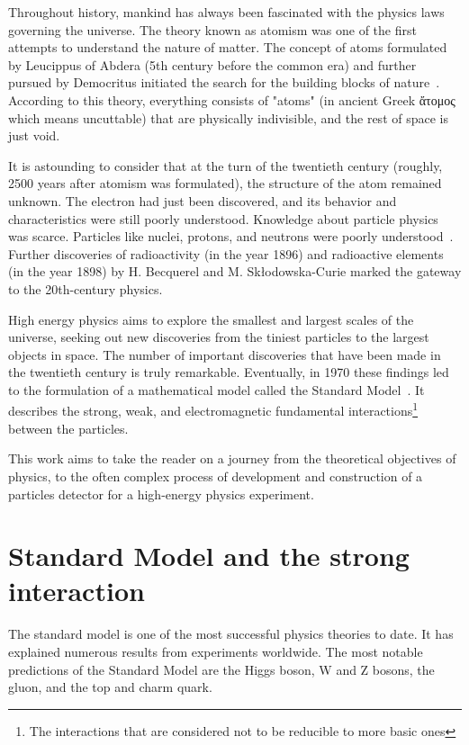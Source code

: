 Throughout history, mankind has always been fascinated with the physics laws governing the universe. The theory known as atomism was one of the first attempts to understand the nature of matter. The concept of atoms formulated by Leucippus of Abdera (5th century before the common era) and further pursued by Democritus initiated the search for the building blocks of nature~\cite{sep-atomism-ancient}. According to this theory, everything consists of "atoms" (in ancient Greek \foreignlanguage{greek}{ἄτομος} which means uncuttable) that are physically indivisible, and the rest of space is just void. 

It is astounding to consider that at the turn of the twentieth century (roughly, 2500 years after atomism was formulated), the structure of the atom remained unknown. The electron had just been discovered, and its behavior and characteristics were still poorly understood. Knowledge about particle physics was scarce. Particles like nuclei, protons, and neutrons were poorly understood~\cite{intro_particle_physics}. 
Further discoveries of radioactivity (in the year 1896) and radioactive elements (in the year 1898) by H. Becquerel and M. Skłodowska-Curie marked the gateway to the 20th-century physics. 

High energy physics aims to explore the smallest and largest scales of the universe, seeking out new discoveries from the tiniest particles to the largest objects in space.
The number of important discoveries that have been made in the twentieth century is truly remarkable. Eventually, in 1970 these findings led to the formulation of a mathematical model called the Standard Model~\cite{intro_particle_physics}.  It describes the strong, weak, and electromagnetic fundamental interactions\footnote{The interactions that are considered not to be reducible to more basic ones} between the particles. 
 
 
 This work aims to take the reader on a journey from the theoretical objectives of physics, to the often complex process of development and construction of a particles detector for a high-energy physics experiment.
 
\section{Standard Model and the strong interaction}

The standard model is one of the most successful physics theories to date. It has explained numerous results from experiments worldwide. The most notable predictions of the Standard Model are the Higgs boson, W and Z bosons, the gluon, and the top and charm quark.

